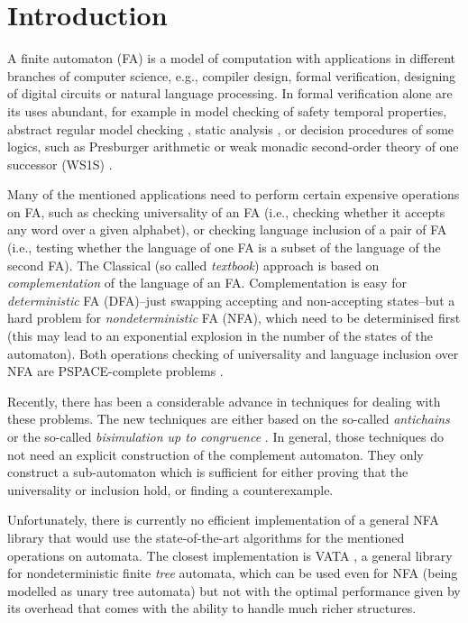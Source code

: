 \chapter{Introduction}
\label{introduction}
A finite automaton (FA) is a model of computation with applications in different branches of computer science, e.g., compiler design, formal verification, 
designing of digital circuits or natural language processing. In formal verification alone are its uses abundant, 
for example in model checking of safety temporal properties, abstract regular model checking \cite{armc}, static analysis \cite{metal}, 
or decision procedures of some logics, such as Presburger arithmetic or weak 
monadic second-order theory of one successor (WS1S) \cite{mona}.

Many of the mentioned applications need to perform certain expensive operations on FA, such as checking universality of an FA (i.e., checking whether it
accepts any word over a given alphabet), or checking language inclusion of a pair of FA (i.e., testing whether the language of one FA is a subset of the language
of the second FA). The Classical (so called \emph{textbook}) approach is based on \emph{complementation} of the language of an FA. Complementation is easy for 
\emph{deterministic} FA (DFA)--just swapping accepting and non-accepting states--but a hard problem for \emph{nondeterministic} FA (NFA), which need 
to be determinised first (this may lead to an exponential explosion in the number of the states of the automaton). 
Both operations checking of universality and language inclusion over NFA are PSPACE-complete problems \cite{cav06}.

Recently, there has been a considerable advance in techniques for dealing with these problems. The new techniques are either based on the so-called 
\emph{antichains} \cite{cav06,tacas10} or the so-called \emph{bisimulation up to congruence} \cite{popl13}. 
In general, those techniques do not need an explicit construction of the complement
automaton. They only construct a sub-automaton which is sufficient for either proving that the universality or inclusion hold, or finding a counterexample.

Unfortunately, there is currently no efficient implementation of a general NFA library that would use the state-of-the-art algorithms for the mentioned
operations on automata. The
closest implementation is VATA \cite{libvata}, a general library for nondeterministic finite \emph{tree} automata, which can be used even for NFA (being modelled 
as unary tree automata) but not with the optimal performance given by its overhead that comes with the ability to handle much richer structures. 
 
